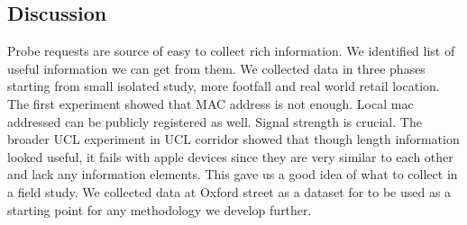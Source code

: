 \subsection{Discussion}
Probe requests are source of easy to collect rich information.
We identified list of useful information we can get from them.
We collected data in three phases starting from small isolated study, more footfall and real world retail location.
The first experiment showed that MAC address is not enough. Local mac addressed can be publicly registered as well.
Signal strength is crucial.
The broader UCL experiment in UCL corridor showed that though length information looked useful, it fails with apple devices since they are very similar to each other and lack any information elements. 
This gave us a good idea of what to collect in a field study. 
We collected data at Oxford street as a dataset for to be used as a starting point for any methodology we develop further.

